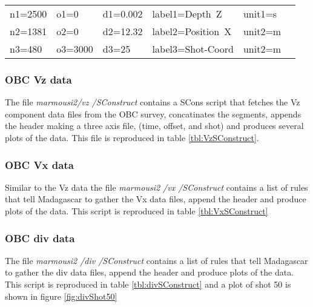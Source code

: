{
\begin{tabular}[t]{|llllll|}
        \hline
        n1=2500    &   o1=0     &   d1=0.002    &    label1=Depth\ Z     &  unit1=s  &  \\
        n2=1381    &   o2=0     &   d2=12.32    &    label2=Position\ X  &  unit2=m  &  \\
	n3=480 	   &   o3=3000  &   d3=25	&    label3=Shot-Coord   &  unit2=m  &  \\
        \hline
\end{tabular}
}


\subsubsection{OBC Vz data}
The file \emph{marmousi2\slash vz \slash SConstruct} contains a SCons script that fetches the Vz component
data files from the OBC survey, concatinates the segments, appends the header making a 
three axis file, (time, offset, and shot) and produces several plots of the data.  This file is reproduced in table 
\ref{tbl:VzSConstruct}.  

{
\tiny

\normalsize
}

\subsubsection{OBC Vx data}
Similar to the Vz data the file \emph{marmousi2 \slash vx \slash SConstruct} contains a list of rules that tell
Madagascar to gather the Vx data files, append the header and produce plots of the data.  This script is reproduced 
in table \ref{tbl:VxSConstruct}
{
\tiny

\normalsize
}


\subsubsection{OBC div data}
The file \emph{marmousi2 \slash div \slash SConstruct} contains a list of rules that tell Madagascar to gather the 
div data files, append the header and produce plots of the data.  This script is reproduced 
in table \ref{tbl:divSConstruct} and a plot of shot 50 is shown in figure \ref{fig:divShot50}

{
\tiny

\normalsize
}

